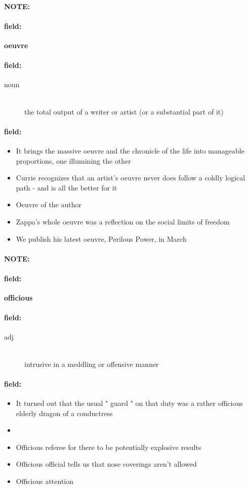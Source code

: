 \documentclass[12pt]{article}
\newenvironment{note}{\paragraph{NOTE:}}{}
\newenvironment{field}{\paragraph{field:}}{}
\begin{document}
\begin{note}
\begin{field}
\textbf{\large oeuvre}
\end{field}


\begin{field}
\begin{description}
\item[noun] \hfill \\ 
the total output of a writer or artist (or a substantial part of it)

\end{description}
\end{field}

\begin{field}
\begin{itemize}
\item It brings the massive oeuvre and the chronicle of the life into manageable proportions, one illumining the other
\item Currie recognizes that an artist's oeuvre never does follow a coldly logical path - and is all the better for it
\item Oeuvre of the author
\item Zappa's whole oeuvre was a reflection on the social limits of freedom
\item We publish his latest oeuvre, Perilous Power, in March
\end{itemize}
\end{field}
\end{note}
\begin{note}
\begin{field}
\textbf{\large officious}
\end{field}


\begin{field}
\begin{description}
\item[adj] \hfill \\ 
intrusive in a meddling or offensive manner

\end{description}
\end{field}

\begin{field}
\begin{itemize}
\item It turned out that the usual " guard " on that duty was a rather officious elderly dragon of a conductress
\item 
\item Officious referee for there to be potentially explosive results
\item Officious official tells us that nose coverings aren't allowed
\item Officious attention
\end{itemize}
\end{field}
\end{note}
\end{document}
